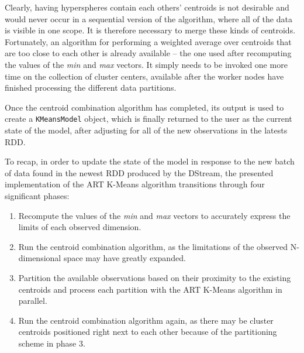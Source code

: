 \documentclass{l4proj}
\begin{document}
Clearly, having hyperspheres contain each others' centroids is not desirable and would never occur in a sequential version of the algorithm, where all of the data is visible in one scope. It is therefore necessary to merge these kinds of centroids. Fortunately, an algorithm for performing a weighted average over centroids that are too  close to each other is already available -- the one used after recomputing the values of the \textit{min} and \textit{max} vectors. It simply needs to be invoked one more time on the collection of cluster centers, available after the worker nodes have finished processing the different data partitions. 

Once the centroid combination algorithm has completed, its output is used to create a \texttt{KMeansModel} object, which is finally returned to the user as the current state of the model, after adjusting for all of the new observations in the latests RDD.

To recap, in order to update the state of the model in response to the new batch of data found in the newest RDD produced by the DStream, the presented implementation of the ART K-Means algorithm transitions through four significant phases:

\begin{enumerate}
\item Recompute the values of the \textit{min} and \textit{max} vectors to accurately express the limits of each observed dimension.
\item Run the centroid combination algorithm, as the limitations of the observed N-dimensional space may have greatly expanded.
\item Partition the available observations based on their proximity to the existing centroids and process each partition with the ART K-Means algorithm in parallel.
\item Run the centroid combination algorithm again, as there may be cluster centroids positioned right next to each other because of the partitioning scheme in phase 3.
\end{enumerate}
\end{document}
